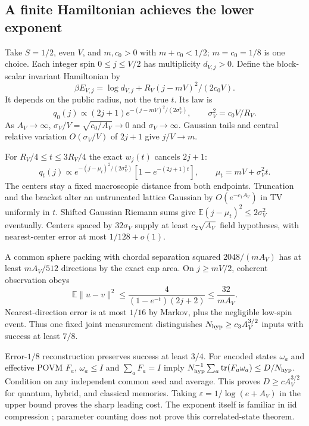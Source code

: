 \documentclass[11pt]{article}
\theoremstyle{definition}
\DeclareMathOperator{\tr}{tr}
\newcommand{\E}{\mathbb E}
\newcommand{\eps}{\varepsilon}
\begin{document}
\subsection{A finite Hamiltonian achieves the lower exponent}
Take $S=1/2$, even $V$, and $m,c_0>0$ with $m+c_0<1/2$;
$m=c_0=1/8$ is one choice. Each integer spin $0\le j\le V/2$
has multiplicity $d_{V,j}>0$. Define the block-scalar invariant
Hamiltonian by
\[
 \beta E_{V,j}=\log d_{V,j}
 +R_V(j-mV)^2/(2c_0V).
\]
It depends on the public radius, not the true $t$. Its law is
\[
 q_0(j)\propto(2j+1)
 e^{-(j-mV)^2/(2\sigma_V^2)},\qquad
 \sigma_V^2=c_0V/R_V.
\]
As $A_V\to\infty$, $\sigma_V/V=\sqrt{c_0/A_V}\to0$ and
$\sigma_V\to\infty$. Gaussian tails and central relative variation
$O(\sigma_V/V)$ of $2j+1$ give $j/V\to m$.

For $R_V/4\le t\le3R_V/4$ the exact $w_j(t)$ cancels $2j+1$:
\[
 q_t(j)\propto e^{-(j-\mu_t)^2/(2\sigma_V^2)}
 [1-e^{-(2j+1)t}],\qquad \mu_t=mV+\sigma_V^2t.
\]
The centers stay a fixed macroscopic distance from both endpoints.
Truncation and the bracket alter an untruncated lattice Gaussian
by $O(e^{-c_1A_V})$ in TV uniformly in $t$.
Shifted Gaussian Riemann sums give
$\E(j-\mu_t)^2\le2\sigma_V^2$ eventually.
Centers spaced by $32\sigma_V$ supply at least
$c_2\sqrt{A_V}$ field hypotheses, with nearest-center error at most
$1/128+o(1)$.

A common sphere packing with chordal separation squared
$2048/(mA_V)$ has at least $mA_V/512$ directions by the exact cap
area. On $j\ge mV/2$, coherent observation obeys
\[
 \E\|u-v\|^2\le
 \frac4{(1-e^{-t})(2j+2)}\le\frac{32}{mA_V}.
\]
Nearest-direction error is at most $1/16$ by Markov, plus the
negligible low-spin event. Thus one fixed joint measurement
distinguishes $N_{\rm hyp}\ge c_3A_V^{3/2}$ inputs with success
at least $7/8$.

Error-$1/8$ reconstruction preserves success at least $3/4$.
For encoded states $\omega_a$ and effective POVM $F_a$,
$\omega_a\le I$ and $\sum_aF_a=I$ imply
$N_{\rm hyp}^{-1}\sum_a\tr(F_a\omega_a)\le D/N_{\rm hyp}$.
Condition on any independent common seed and average.
This proves $D\ge cA_V^{3/2}$ for quantum, hybrid, and classical
memories. Taking $\eps=1/\log(e+A_V)$ in the upper bound proves
the sharp leading cost.
The exponent itself is familiar in iid compression
\cite{qubitcompression,population}; parameter counting does not
prove this correlated-state theorem.
\end{document}
